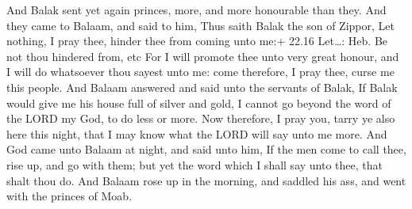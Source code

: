  And Balak sent yet again princes, more, and more
honourable than they.  And they came to Balaam, and said to
him, Thus saith Balak the son of Zippor, Let nothing, I pray thee,
hinder thee from coming unto me:+ 22.16 Let\ldots: Heb. Be not thou
hindered from, etc  For I will promote thee unto very great
honour, and I will do whatsoever thou sayest unto me: come therefore, I
pray thee, curse me this people.  And Balaam answered and
said unto the servants of Balak, If Balak would give me his house full
of silver and gold, I cannot go beyond the word of the LORD my God, to
do less or more.  Now therefore, I pray you, tarry ye also
here this night, that I may know what the LORD will say unto me more.
 And God came unto Balaam at night, and said unto him, If
the men come to call thee, rise up, and go with them; but yet the word
which I shall say unto thee, that shalt thou do.  And
Balaam rose up in the morning, and saddled his ass, and went with the
princes of Moab.

